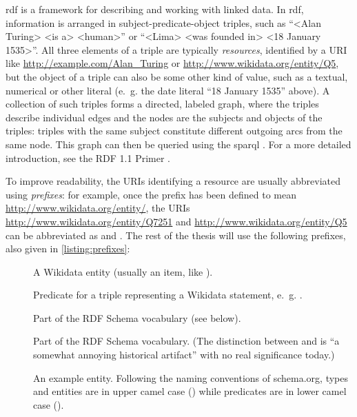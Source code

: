 \acrfull{rdf}
\cite{Lanthaler:14:RCA}
is a framework for describing and working with linked data.
In \gls{rdf}, information is arranged in subject-predicate-object triples,
such as “<Alan Turing> <is a> <human>”
or “<Lima> <was founded in> <18 January 1535>”.
All three elements of a triple are typically \emph{resources},
identified by a URI like \url{http://example.com/Alan_Turing} or \url{http://www.wikidata.org/entity/Q5}, %
but the object of a triple can also be some other kind of value,
such as a textual, numerical or other literal
(e.~g. the date literal “18 January 1535” above). %
A collection of such triples forms a directed, labeled graph,
where the triples describe individual edges
and the nodes are the subjects and objects of the triples:
triples with the same subject constitute different outgoing arcs from the same node.
This graph can then be queried using the \acrlong{sparql} \cite{9569543}. %
For a more detailed introduction,
see the RDF 1.1 Primer \cite{Schreiber:14:RP}.

To improve readability, the URIs identifying a resource are usually abbreviated using \emph{prefixes}:
for example, once the prefix  has been defined to mean \url{http://www.wikidata.org/entity/},
the URIs \url{http://www.wikidata.org/entity/Q7251} and \url{http://www.wikidata.org/entity/Q5}
can be abbreviated as  and .
The rest of the thesis will use the following prefixes,
also given in \cref{listing:prefixes}:

\begin{description}
\item[] A Wikidata entity (usually an item, like ).
\item[] Predicate for a triple representing a Wikidata statement, e.~g. .
\item[] Part of the RDF Schema vocabulary (see below).
\item[] Part of the RDF Schema vocabulary.
  (The distinction between  and  is “a somewhat annoying historical artifact” \cite{Schreiber:14:RP}
  with no real significance today.)
\item[] An example entity.
  Following the naming conventions of schema.org, %
  types and entities are in upper camel case ()
  while predicates are in lower camel case ().
\end{description}

